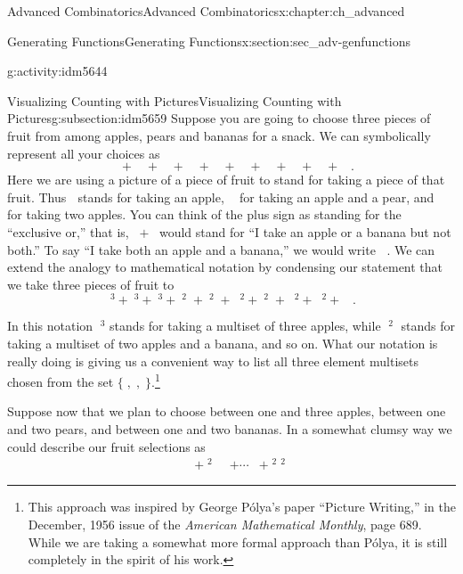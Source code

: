 \documentclass[oneside,10pt,]{book}
\numberwithin{equation}{chapter}
\newcommand{\apple}{\text{🍎}}
\newcommand{\ap}{\apple}
\newcommand{\banana}{\text{🍌}}
\newcommand{\ba}{\banana}
\newcommand{\pear}{\text{🍐}}
\newcommand{\pe}{\pear}
\newcommand{\amp}{&}
\begin{document}
\begin{chapterptx}{Advanced Combinatorics}{}{Advanced Combinatorics}{}{}{x:chapter:ch_advanced}
\begin{sectionptx}{Generating Functions}{}{Generating Functions}{}{}{x:section:sec_adv-genfunctions}
\begin{introduction}{}
\begin{activity}{}{g:activity:idm5644}
\begin{enumerate}[font=\bfseries,label=(\alph*),ref=\alph*]
\end{enumerate}
\end{activity}
\end{introduction}%
%
%
\typeout{************************************************}
\typeout{************************************************}
%
\begin{subsectionptx}{Visualizing Counting with Pictures}{}{Visualizing Counting with Pictures}{}{}{g:subsection:idm5659}
Suppose you are going to choose three pieces of fruit from among apples, pears and bananas for a snack.  We can symbolically represent all your choices as%
\begin{equation*}
\ap\ap\ap+\pe\pe\pe+\ba\ba\ba+\ap\ap\pe+\ap\ap\ba+\ap\pe\pe +\pe\pe\ba
+\ap\ba\ba+\pe\ba\ba+\ap\pe\ba.
\end{equation*}
Here we are using a picture of a piece of fruit to stand for taking a piece of that fruit. Thus \(\ap\) stands for taking an apple, \(\ap\pe\) for taking an apple and a pear, and \(\ap\ap\) for taking two apples.  You can think of the plus sign as standing for the ``exclusive or,'' that is, \(\ap+\ba\) would stand for ``I take an apple or a banana but not both.'' To say ``I take both an apple and a banana,'' we would write \(\ap\ba\). We can extend the analogy to mathematical notation by condensing our statement that we take three pieces of fruit to%
\begin{equation*}
\ap^3+\pe^3+\ba^3+\ap^2\pe+\ap^2\ba +\ap\pe^2+\pe^2\ba+
\ap\ba^2+\pe\ba^2 +\ap\pe\ba.
\end{equation*}
%
\par
In this notation \(\ap^3\) stands for taking a multiset of three apples, while \(\ap^2\ba\) stands for taking a multiset of two apples and a banana, and so on. What our notation is really doing is giving us a convenient way to list all three element multisets chosen from the set \(\{\ap,\pe,\ba\}\).\footnote{This approach was inspired by George Pólya's paper ``Picture Writing,'' in the December, 1956 issue of the \textsl{American Mathematical Monthly}, page 689. While we are taking a somewhat more formal approach than Pólya, it is still completely in the spirit of his work.\label{g:fn:idm5676}}%
\par
Suppose now that we plan to choose between one and three apples, between one and two pears, and between one and two bananas. In a somewhat clumsy way we could describe our fruit selections as%
\begin{align}
\ap\pe\ba\amp+\ap^2\pe\ba\amp+\cdots\amp+\ap^2\pe^2\ba

\end{align}
\end{subsectionptx}
\end{sectionptx}
\end{chapterptx}
\end{document}
